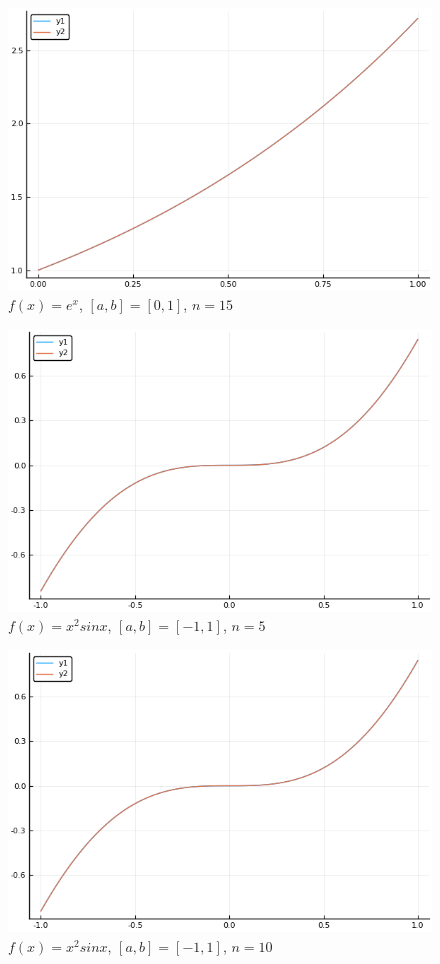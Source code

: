 \documentclass{article}
\begin{document}
\begin{figure}[H]
	\includegraphics[width=\linewidth]{zad5a_15.png}
	\caption{$f(x) = e^x$, $[a,b]=[0,1]$, $n=15$}
	\label{fig:5a5}
\end{figure}
\begin{figure}[H]
	\includegraphics[width=\linewidth]{zad5b_5.png}
	\caption{$f(x) = x^2 sin x$, $[a,b]=[-1,1]$, $n=5$}
	\label{fig:5a5}
\end{figure}
\begin{figure}[H]
	\includegraphics[width=\linewidth]{zad5b_10.png}
	\caption{$f(x) = x^2 sin x$, $[a,b]=[-1,1]$, $n=10$}
	\label{fig:5a5}
\end{figure}
\end{document}
